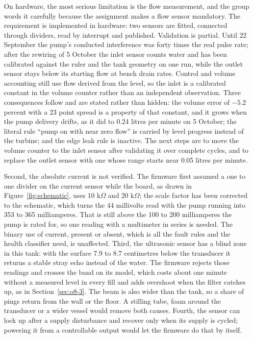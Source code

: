 On hardware, the most serious limitation is the flow measurement, and the group words it carefully because the assignment makes a flow sensor mandatory. The requirement is implemented in hardware: two sensors are fitted, connected through dividers, read by interrupt and published. Validation is partial. Until 22 September the pump's conducted interference was forty times the real pulse rate; after the rewiring of 5 October the inlet sensor counts water and has been calibrated against the ruler and the tank geometry on one run, while the outlet sensor stays below its starting flow at bench drain rates. Control and volume accounting still use flow derived from the level, so the inlet is a calibrated constant in the volume counter rather than an independent observation. Three consequences follow and are stated rather than hidden: the volume error of $-5.2$ percent with a 23 point spread is a property of that constant, and it grows when the pump delivery drifts, as it did to 0.24 litres per minute on 5 October; the literal rule ``pump on with near zero flow'' is carried by level progress instead of the turbine; and the edge leak rule is inactive. The next steps are to move the volume counter to the inlet sensor after validating it over complete cycles, and to replace the outlet sensor with one whose range starts near 0.05 litres per minute.

Second, the absolute current is not verified. The firmware first assumed a one to one divider on the current sensor while the board, as drawn in Figure~\ref{fig:schematic}, uses 10 k$\Omega$ and 20 k$\Omega$; the scale factor has been corrected to the schematic, which turns the 44 millivolts read with the pump running into 353 to 365 milliamperes. That is still above the 100 to 200 milliamperes the pump is rated for, so one reading with a multimeter in series is needed. The binary use of current, present or absent, which is all the fault rules and the health classifier need, is unaffected. Third, the ultrasonic sensor has a blind zone in this tank: with the surface 7.9 to 8.7 centimetres below the transducer it returns a stable stray echo instead of the water. The firmware rejects those readings and crosses the band on its model, which costs about one minute without a measured level in every fill and adds overshoot when the filter catches up, as in Section~\ref{sec:o8-3}. The beam is also wider than the tank, so a share of pings return from the wall or the floor. A stilling tube, foam around the transducer or a wider vessel would remove both causes. Fourth, the sensor can lock up after a supply disturbance and recover only when its supply is cycled; powering it from a controllable output would let the firmware do that by itself.

